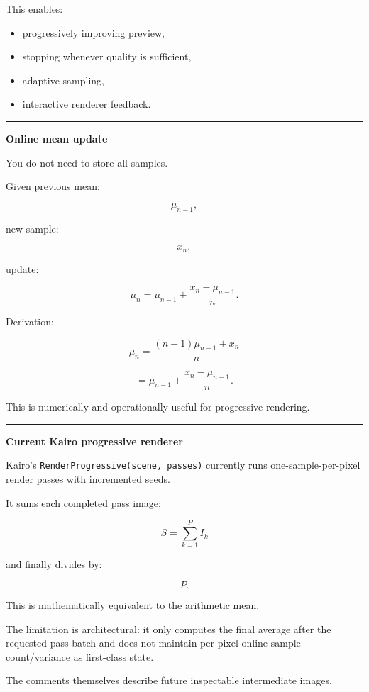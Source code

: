 This enables:

\begin{itemize}
\tightlist
\item
  progressively improving preview,
\item
  stopping whenever quality is sufficient,
\item
  adaptive sampling,
\item
  interactive renderer feedback.
\end{itemize}

\begin{center}\rule{0.5\linewidth}{0.5pt}\end{center}

\textbf{Online mean update}

You do not need to store all samples.

Given previous mean:

\[
\mu_{n-1},
\]

new sample:

\[
x_n,
\]

update:

\[
\boxed{
\mu_n
=
\mu_{n-1}
+
\frac{
x_n-\mu_{n-1}
}{
n
}.
}
\]

Derivation:

\[
\mu_n
=
\frac{
(n-1)\mu_{n-1}+x_n
}{
n
}
\]

\[
=
\mu_{n-1}
+
\frac{x_n-\mu_{n-1}}{n}.
\]

This is numerically and operationally useful for progressive rendering.

\begin{center}\rule{0.5\linewidth}{0.5pt}\end{center}

\textbf{Current Kairo progressive renderer}

Kairo's \texttt{RenderProgressive(scene,\ passes)} currently runs one-sample-per-pixel render passes with incremented seeds.

It sums each completed pass image:

\[
S=
\sum_{k=1}^{P}I_k
\]

and finally divides by:

\[
P.
\]

This is mathematically equivalent to the arithmetic mean.

The limitation is architectural: it only computes the final average after the requested pass batch and does not maintain per-pixel online sample count/variance as first-class state.

The comments themselves describe future inspectable intermediate images.


